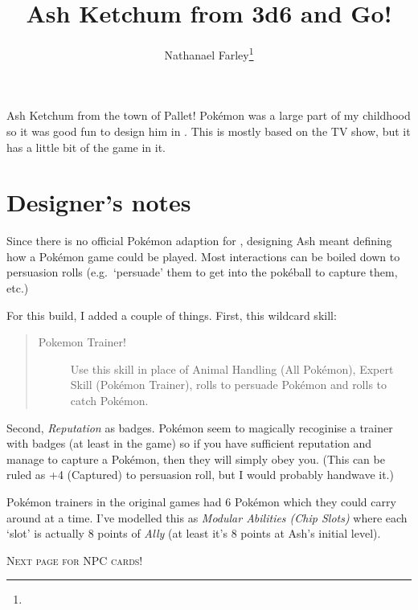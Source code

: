 \documentclass{article}
\newcommand{\pokemon}{Pok\'emon\xspace}
\begin{document}
\title{Ash Ketchum from 3d6 and Go!}
\author{Nathanael Farley\thanks{}}
\maketitle


Ash Ketchum from the town of Pallet! \pokemon was a large part of my childhood
so it was good fun to design him in \gurps. This is mostly based on the TV show,
but it has a little bit of the game in it.

\section*{Designer's notes}
\label{sec:designers-notes}

Since there is no official \pokemon adaption for \gurps, designing Ash meant
defining how a \pokemon game could be played. Most interactions can be boiled
down to persuasion rolls (e.g.~`persuade' them to get into the pok\'eball to
capture them, etc.)

For this build, I added a couple of things. First, this wildcard skill:
\begin{quote}
  \begin{description}
  \item[Pokemon Trainer!] Use this skill in place of Animal Handling (All
    \pokemon), Expert Skill (\pokemon Trainer), rolls to persuade \pokemon and
    rolls to catch \pokemon.
  \end{description}
\end{quote}
Second, \emph{Reputation} as badges. \pokemon seem to magically recoginise a
trainer with badges (at least in the game) so if you have sufficient reputation
and manage to capture a \pokemon, then they will simply obey you. (This can be
ruled as +4 (Captured) to persuasion roll, but I would probably handwave it.)

\pokemon trainers in the original games had 6 \pokemon which they could carry
around at a time. I've modelled this as \emph{Modular Abilities (Chip Slots)}
where each `slot' is actually 8 points of \emph{Ally} (at least it's 8 points at
Ash's initial level).

\vfill
\begin{center}
  \textsc{Next page for NPC cards!}
\end{center}


\clearpage
\centering
\vspace*{\fill}
\vfill
{}
\vfill





\end{document}
